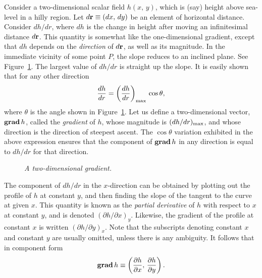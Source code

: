 Consider a two-dimensional scalar field $h(x,\,y)$, which is (say) height above sea-level in a hilly region.
Let  $d{\bf r}\equiv(dx,\,dy)$ be an element of horizontal distance. Consider
$dh/dr$, where $dh$ is the change in height after moving an infinitesimal distance
$d{\bf r}$. This quantity is  somewhat like the one-dimensional gradient, except that
$dh$ depends on the {\em direction}\/ of $d{\bf r}$, as well as its magnitude. 
In the immediate vicinity of some point $P$, the slope reduces to an inclined plane. See Figure~\ref{f15}.
The largest value of $dh/dr$ is straight up the slope. It is easily shown that for any other direction
\begin{equation}
\frac{dh}{dr}= \left(\frac{dh}{dr}\right)_{\rm max}\, \cos\theta,
\end{equation}
where $\theta$ is the angle shown in Figure~\ref{f15}. 
Let us define a two-dimensional vector, ${\bf  grad}\,h$, 
called the {\em gradient}\/ of $h$, whose magnitude is
$(dh/dr)_{\rm max}$, and whose direction is the direction of steepest ascent.
The $\cos\theta$ variation exhibited in the above expression ensures that the component of ${\bf grad}\,h$ in any
direction is equal to $dh/dr$ for that direction. 

\begin{figure}
\epsfysize=2.25in
\centerline{}
\caption{\em A two-dimensional gradient.}\label{f15}
\end{figure}

The component of $dh/dr$ in the $x$-direction can be  obtained by plotting out the
profile of $h$ at constant $y$, and then finding the slope of the tangent to the
curve at given $x$. This quantity is known as the {\em partial derivative}\/ of
$h$ with respect to $x$ at constant $y$, and is denoted $(\partial h/\partial x)_y$.
Likewise, the gradient of the profile at constant $x$ is written
$(\partial h/\partial y)_x$. Note that the subscripts denoting constant $x$ and
constant $y$ are usually omitted, unless there is any ambiguity. It follows that
in component form
\begin{equation}
{\bf grad}\,h \equiv \left(\frac{\partial h}{\partial x},\, \frac{\partial h}{\partial y}
\right).
\end{equation}

